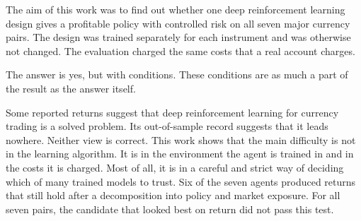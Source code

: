 \label{Chapter:Conclusion}

The aim of this work was to find out whether one deep reinforcement learning design gives a profitable policy with controlled risk on all seven major currency pairs. The design was trained separately for each instrument and was otherwise not changed. The evaluation charged the same costs that a real account charges.

The answer is yes, but with conditions. These conditions are as much a part of the result as the answer itself.







Some reported returns suggest that deep reinforcement learning for currency trading is a solved problem. Its out-of-sample record suggests that it leads nowhere. Neither view is correct. This work shows that the main difficulty is not in the learning algorithm. It is in the environment the agent is trained in and in the costs it is charged. Most of all, it is in a careful and strict way of deciding which of many trained models to trust. Six of the seven agents produced returns that still hold after a decomposition into policy and market exposure. For all seven pairs, the candidate that looked best on return did not pass this test.